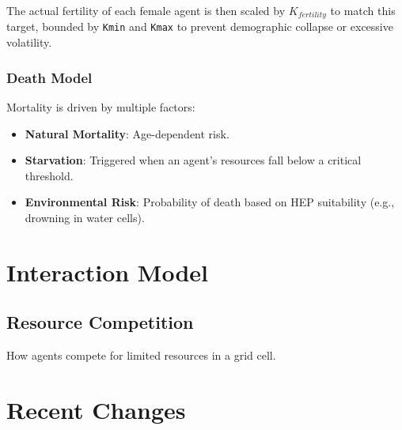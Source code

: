 \documentclass[11pt,a4paper]{report}
\begin{document}
The actual fertility of each female agent is then scaled by $K_{fertility}$ to match this target, bounded by \texttt{Kmin} and \texttt{Kmax} to prevent demographic collapse or excessive volatility.

\subsection{Death Model}
Mortality is driven by multiple factors:
\begin{itemize}
    \item \textbf{Natural Mortality}: Age-dependent risk.
    \item \textbf{Starvation}: Triggered when an agent's resources fall below a critical threshold.
    \item \textbf{Environmental Risk}: Probability of death based on HEP suitability (e.g., drowning in water cells).
\end{itemize}

\chapter{Interaction Model}
\section{Resource Competition}
How agents compete for limited resources in a grid cell.

\chapter{Recent Changes}

\end{document}
